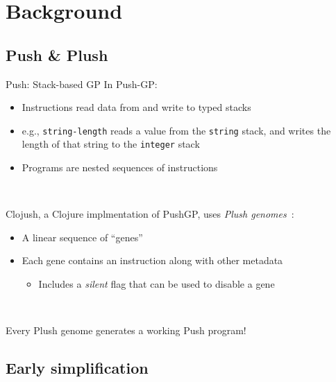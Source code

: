 \documentclass{beamer}
\begin{document}

\section{Background}

\subsection{Push \& Plush}

\begin{frame}{Push: Stack-based GP}
In Push-GP:
\begin{itemize}
	\item Instructions read data from and write to typed stacks
	\item e.g., \texttt{string-length} reads a value from the \texttt{string} stack, and writes the length of that string to the \texttt{integer} stack
	\item Programs are nested sequences of instructions
\end{itemize}

~

Clojush, a Clojure implmentation of PushGP, uses \emph{Plush genomes}~\cite{Helmuth:2016:GPTP}:
\begin{itemize}
	\item A linear sequence of ``genes''
	\item Each gene contains an instruction along with other metadata
	\begin{itemize}
		\item Includes a \emph{silent} flag that can be used to disable a gene
	\end{itemize}
\end{itemize}

~

Every Plush genome generates a working Push program!

\end{frame}

\subsection{Early simplification}
\end{document}
